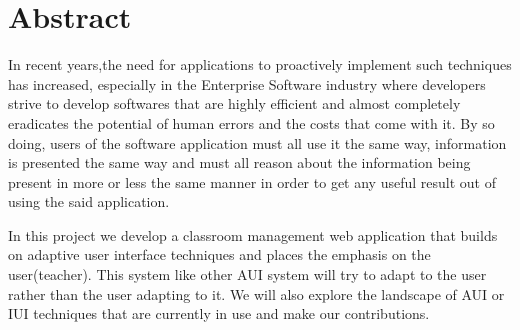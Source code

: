 \section*{Abstract}
In recent years,the need for applications to proactively implement such techniques has increased, especially in the Enterprise Software industry where developers strive to develop softwares that are highly efficient and almost completely eradicates the potential of human errors and the costs that come with it. By so doing, users of the software application must all use it the same way, information is presented the same way and must all reason about the information being present in more or less the same manner in order to get any useful result out of using the said application.

In this project we develop a classroom management web application that builds on adaptive user interface techniques and places the emphasis on the user(teacher). This system like other AUI system will try to adapt to the user rather than the user adapting to it. We will also explore the landscape of AUI or IUI techniques that are currently in use and make our contributions.
